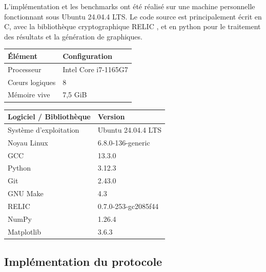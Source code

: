 \documentclass[10pt,a4paper]{article}
\theoremstyle{definition}
\theoremstyle{plain}
\theoremstyle{remark}
\begin{document}
L'implémentation et les benchmarks ont été réalisé sur une machine personnelle fonctionnant sous Ubuntu 24.04.4 LTS.
Le code source est principalement écrit en C, avec la bibliothèque cryptographique RELIC \cite{relic}, et en python pour le traitement des résultats
et la génération de graphiques.
\begin{table}[H]
    \centering

    \begin{minipage}[t]{0.43\textwidth}
        \centering
        \begin{tabular}{ll}
            \toprule
            \textbf{Élément} & \textbf{Configuration} \\
            \midrule
            Processeur & Intel Core i7-1165G7 \\
            Cœurs logiques & 8 \\
            Mémoire vive & 7,5 GiB \\
            \bottomrule
        \end{tabular}
        \label{tab:hardware}
    \end{minipage}
    \hfill
    \begin{minipage}[t]{0.53\textwidth}
        \centering
        \begin{tabular}{ll}
            \toprule
            \textbf{Logiciel / Bibliothèque} & \textbf{Version} \\
            \midrule
            Système d'exploitation & Ubuntu 24.04.4 LTS \\
            Noyau Linux & 6.8.0-136-generic \\
            GCC & 13.3.0 \\
            Python & 3.12.3 \\
            Git & 2.43.0 \\
            GNU Make & 4.3 \\
            RELIC & 0.7.0-253-gc2085f44 \\
            NumPy & 1.26.4 \\
            Matplotlib & 3.6.3 \\
            \bottomrule
        \end{tabular}
        \label{tab:software}
    \end{minipage}

\end{table}

\subsection{Implémentation du protocole}\label{sec:impl}
\end{document}
